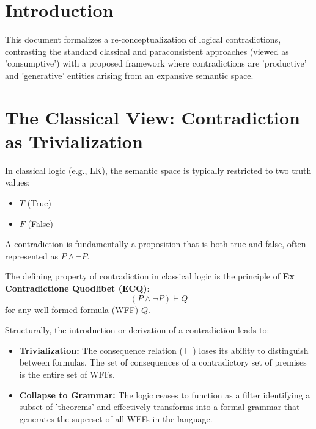 











	
	\section{Introduction}
	
	This document formalizes a re-conceptualization of logical contradictions, contrasting the standard classical and paraconsistent approaches (viewed as 'consumptive') with a proposed framework where contradictions are 'productive' and 'generative' entities arising from an expansive semantic space.
	
	\section{The Classical View: Contradiction as Trivialization}
	
	In classical logic (e.g., LK), the semantic space is typically restricted to two truth values:
	\begin{itemize}
		\item $T$ (True)
		\item $F$ (False)
	\end{itemize}
	A contradiction is fundamentally a proposition that is both true and false, often represented as $P \land \neg P$.
	
	The defining property of contradiction in classical logic is the principle of \textbf{Ex Contradictione Quodlibet (ECQ)}:
	$$ (P \land \neg P) \vdash Q $$
	for any well-formed formula (WFF) $Q$.
	
	Structurally, the introduction or derivation of a contradiction leads to:
	\begin{itemize}
		\item \textbf{Trivialization:} The consequence relation ($\vdash$) loses its ability to distinguish between formulas. The set of consequences of a contradictory set of premises is the entire set of WFFs.
		\item \textbf{Collapse to Grammar:} The logic ceases to function as a filter identifying a subset of 'theorems' and effectively transforms into a formal grammar that generates the superset of all WFFs in the language.
	\end{itemize}
	
